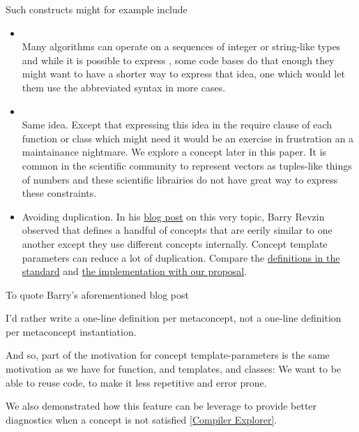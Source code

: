 \documentclass{wg21}
\begin{document}
Such constructs might for example include
\begin{itemize}
\item {}\\
    Many algorithms can operate on a sequences of integer or string-like types and while it is possible to express
    , some code bases do that enough they might want to have a shorter way to express that idea,
    one which would let them use the abbreviated syntax in more cases.

\item {} \\
    Same idea. Except that expressing this idea in the require clause of each function or class which might need it would be an exercise in frustration an
    a maintainance nightmare. We explore a  concept later in this paper.
    It is common in the scientific community to represent vectors as tuples-like things of numbers and these scientific librairies do not have great way to express
    these constraints.

\item Avoiding duplication. In his \href{https://brevzin.github.io/c++/2019/01/09/concept-templates/}{blog post} on this very topic, Barry Revzin observed that  defines a handful of concepts that
are eerily similar to one another except they use different concepts internally. Concept template parameters can reduce a lot of duplication.
Compare the \href{https://eel.is/c++draft/indirectcallable.indirectinvocable}{definitions in the standard} and \href{https://godbolt.org/z/ohKsoKh9G}{the implementation with our proposal}.
\end{itemize}

To quote Barry's aforementioned blog post
\begin{quoteblock}
I’d rather write a one-line definition per metaconcept, not a one-line definition per metaconcept instantiation.
\end{quoteblock}

And so, part of the motivation for concept template-parameters is the same motivation as we have for function, and templates, and classes:
We want to be able to reuse code, to make it less repetitive and error prone.


We also demonstrated how this feature can be leverage to provide better diagnostics when a concept is not satisfied \href{https://compiler-explorer.com/z/sPz5faEbP}{[Compiler Explorer]}.
\end{document}
